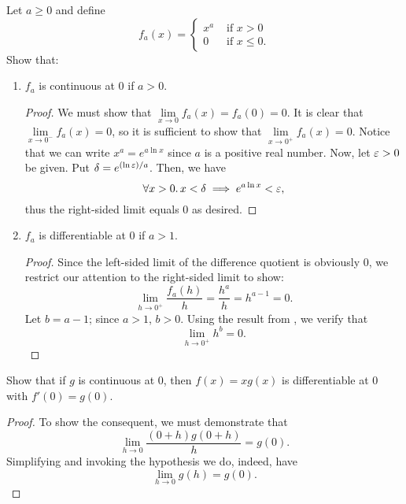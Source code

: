 \begin{problem}
  Let $a \geq 0$ and define
  \[
    f_{a}(x) =
    \begin{cases}
      x^{a} &\text{ if } x > 0\\
      0     &\text{ if } x \leq 0.
    \end{cases}
  \]
  Show that:
  \begin{enumerate}[label=(\roman*)]
    \item $f_{a}$ is continuous at $0$ if $a > 0$. \label{prob:real-positive-powers-rhs-limit}
      \begin{proof}
        We must show that $\lim\limits_{x \to 0} f_{a}(x) = f_{a}(0) = 0$. It is clear that
        $\lim\limits_{x \to 0^{-}} f_{a}(x) = 0$, so it is sufficient to show
        that $\lim\limits_{x \to 0^{+}} f_{a}(x) = 0$. Notice that we can write
        $x^{a} = e^{a \ln{x}}$ since $a$ is a positive real number. Now, let
        $\varepsilon > 0$ be given. Put $\delta = e^{(\ln{\varepsilon})/a}$.
        Then, we have
        \[
          \forall x > 0.\, x < \delta \implies e^{a \ln{x}} < \varepsilon,
        \]
        thus the right-sided limit equals $0$ as desired.
      \end{proof}

    \item $f_{a}$ is differentiable at $0$ if $a > 1$.
      \begin{proof}
        Since the left-sided limit of the difference quotient is obviously $0$,
        we restrict our attention to the right-sided limit to show:
        \[
          \lim_{h \to 0^{+}} \frac{f_{a}(h)}{h} = \frac{h^{a}}{h} = h^{a - 1} = 0.
        \]
        Let $b = a - 1$; since $a > 1$, $b > 0$. Using the result from
        , we verify that
        \[
          \lim_{h \to 0^{+}} h^{b} = 0.
        \]
      \end{proof}
  \end{enumerate}
\end{problem}


\begin{problem}
  Show that if $g$ is continuous at $0$, then $f(x) = xg(x)$ is differentiable at $0$ with $f'(0) = g(0)$.

  \begin{proof}
    To show the consequent, we must demonstrate that
    \[
      \lim_{h \to 0} \frac{(0 + h)g(0 + h)}{h} = g(0).
    \]
    Simplifying and invoking the hypothesis we do, indeed, have
    \[
      \lim_{h \to 0} g(h) = g(0).
    \]
  \end{proof}
\end{problem}
